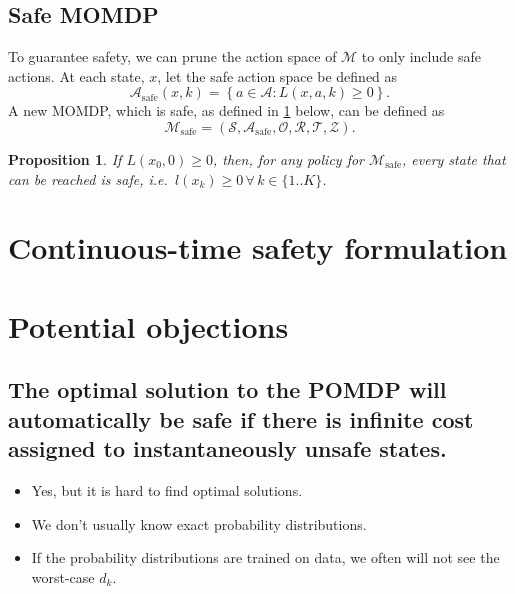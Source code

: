 \documentclass{article}
\newtheorem{prop}{Proposition}
\newcommand{\sspace}{\ensuremath{\mathcal{S}} }
\newcommand{\aspace}{\ensuremath{\mathcal{A}} }
\newcommand{\ospace}{\ensuremath{\mathcal{O}} }
\newcommand{\tdist}{\ensuremath{\mathcal{T}} }
\newcommand{\odist}{\ensuremath{\mathcal{Z}} }
\newcommand{\reward}{\ensuremath{\mathcal{R}} }
\begin{document}
\subsection{Safe MOMDP}

To guarantee safety, we can prune the action space of $\mathcal{M}$ to only include safe actions. At each state, $x$, let the safe action space be defined as
\begin{equation}
    \aspace_\text{safe}(x, k) = \left\{a \in \aspace : L(x,a,k) \geq 0 \right\} \text{.}
\end{equation}
A new MOMDP, which is safe, as defined in \cref{prop:safe} below, can be defined as
\begin{equation}
    \mathcal{M}_\text{safe} = (\sspace, \aspace_\text{safe}, \ospace, \reward, \tdist, \odist) \text{.}
\end{equation}

\begin{prop}
    If $L(x_0, 0)\geq 0$, then, for any policy for $\mathcal{M}_\text{safe}$, every state that can be reached is safe, i.e.\ $l(x_k) \geq 0 \, \forall\, k \in \{1..K\}$.
    \label{prop:safe}
\end{prop}

\section{Continuous-time safety formulation}


\section{Potential objections}

\subsection{The optimal solution to the POMDP will automatically be safe if there is infinite cost assigned to instantaneously unsafe states.}

\begin{itemize}
    \item Yes, but it is hard to find optimal solutions.
    \item We don't usually know exact probability distributions.
    \item If the probability distributions are trained on data, we often will not see the worst-case $d_k$.
\end{itemize}
\end{document}
